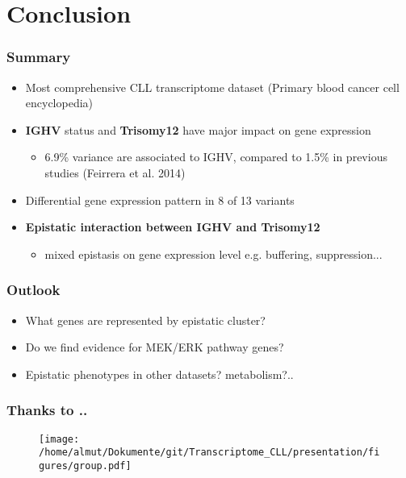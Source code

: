 \documentclass[xcolor=dvipsnames,t,10pt]{beamer}
\begin{document}
\section{Conclusion}
%
%
\begin{frame}[c]
	\frametitle{Summary}	
	\begin{itemize}
		\item Most comprehensive CLL transcriptome dataset (Primary blood cancer cell encyclopedia)
		\item \textbf{IGHV} status and \textbf{Trisomy12} have major impact on gene expression
		\begin{itemize}
			\item 6.9\% variance are associated to IGHV, compared to 1.5\% in previous studies (Feirrera et al. 2014)
		\end{itemize}
		\item Differential gene expression pattern in 8 of 13 variants
			\item \textbf{Epistatic interaction between IGHV and Trisomy12}
			\begin{itemize}
				\item mixed epistasis on gene expression level e.g. buffering, suppression...
			\end{itemize}
	\end{itemize}
\end{frame}
%
%
\begin{frame}[c]
	\frametitle{Outlook}
	\begin{itemize}
		\item What genes are represented by epistatic cluster?
		\item Do we find evidence for MEK/ERK pathway genes? 
		\item Epistatic phenotypes in other datasets? metabolism?..
	\end{itemize}
\end{frame}
% 
% 
%
\begin{frame}[c]
	\frametitle{Thanks to ..}
	\begin{figure}
		\centering
		\texttt{[image: /home/almut/Dokumente/git/Transcriptome\_CLL/presentation/figures/group.pdf]}
	\end{figure}
\end{frame}
% 
% 
% 
\appendix
\end{document}

